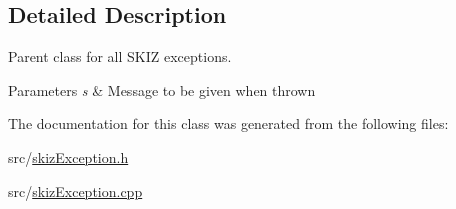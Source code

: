 \subsection{Detailed Description}
Parent class for all S\+K\+IZ exceptions. 


\begin{DoxyParams}{Parameters}
{\em s} & Message to be given when thrown \\
\hline
\end{DoxyParams}


The documentation for this class was generated from the following files\+:\begin{DoxyCompactItemize}
\item 
src/\mbox{\hyperlink{skizException_8h}{skiz\+Exception.\+h}}\item 
src/\mbox{\hyperlink{skizException_8cpp}{skiz\+Exception.\+cpp}}\end{DoxyCompactItemize}
